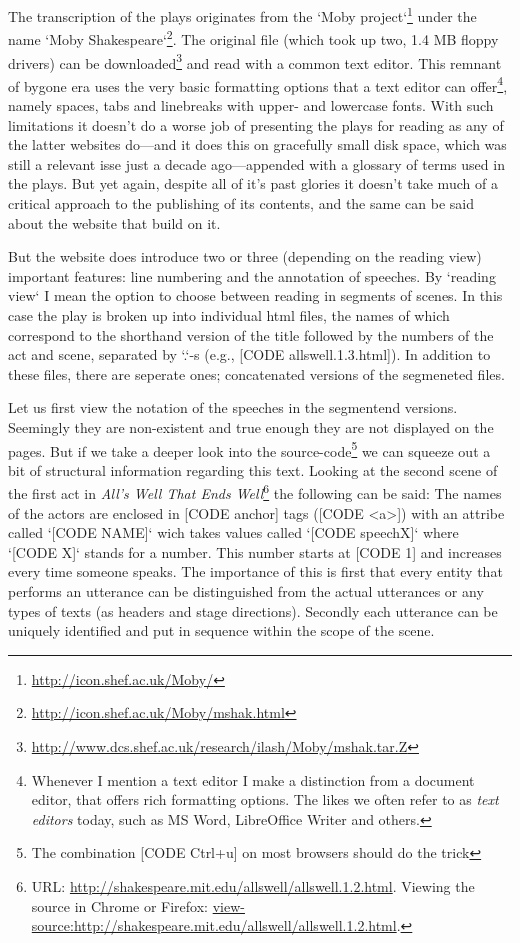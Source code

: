 The transcription of the plays originates from the `Moby project`\footnote{\url{http://icon.shef.ac.uk/Moby/}} under the name `Moby Shakespeare`\footnote{\url{http://icon.shef.ac.uk/Moby/mshak.html}}. The original file (which took up two, 1.4 MB floppy drivers) can be downloaded\footnote{\url{http://www.dcs.shef.ac.uk/research/ilash/Moby/mshak.tar.Z}} and read with a common text editor. This remnant of bygone era uses the very basic formatting options that a text editor can offer\footnote{Whenever I mention a text editor I make a distinction from a document editor, that offers rich formatting options. The likes we often refer to as \textit{text editors} today, such as MS Word, LibreOffice Writer and others.}, namely spaces, tabs and linebreaks with upper- and lowercase fonts. With such limitations it doesn't do a worse job of presenting the plays for reading as any of the latter websites do---and it does this on gracefully small disk space, which was still a relevant isse just a decade ago---appended with a glossary of terms used in the plays. But yet again, despite all of it's past glories it doesn't take much of a critical approach to the publishing of its contents, and the same can be said about the website that build on it.

But the website does introduce two or three (depending on the reading view) important features: line numbering and the annotation of speeches. By `reading view` I mean the option to choose between reading in segments of scenes. In this case the play is broken up into individual html files, the names of which correspond to the shorthand version of the title followed by the numbers of the act and scene, separated by `.`-s (e.g., [CODE allswell.1.3.html]). In addition to these files, there are seperate ones; concatenated versions of the segmeneted files. 

Let us first view the notation of the speeches in the segmentend versions. Seemingly they are non-existent and true enough they are not displayed on the pages. But if we take a deeper look into the source-code\footnote{The combination [CODE Ctrl+u] on most browsers should do the trick} we can squeeze out a bit of structural information regarding this text. Looking at the second scene of the first act in \textit{All's Well That Ends Well}\footnote{URL: \url{http://shakespeare.mit.edu/allswell/allswell.1.2.html}. Viewing the source in Chrome or Firefox: \url{view-source:http://shakespeare.mit.edu/allswell/allswell.1.2.html}.} the following can be said: The names of the actors are enclosed in [CODE anchor] tags ([CODE <a>]) with an attribe called `[CODE NAME]` wich takes values called `[CODE speechX]` where `[CODE X]` stands for a number. This number starts at [CODE 1] and increases every time someone speaks. The importance of this is first that every entity that performs an utterance can be distinguished from the actual utterances or any types of texts (as headers and stage directions). Secondly each utterance can be uniquely identified and put in sequence within the scope of the scene.  

